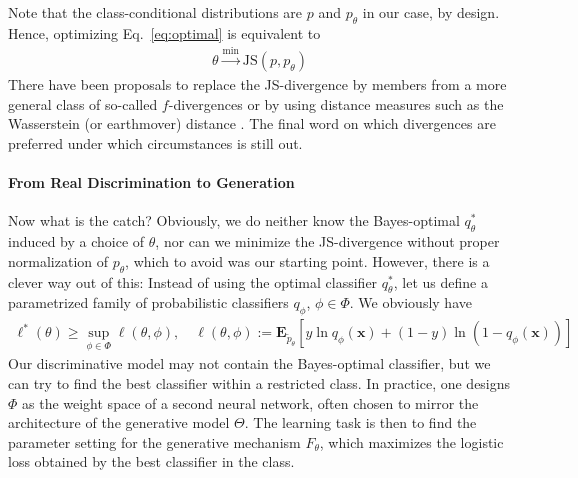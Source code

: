 \documentclass{article}
\newcommand{\E}{{\mathbf E}}
\newcommand{\x}{{\mathbf x}}
\begin{document}
Note that the class-conditional distributions are $p$ and $p_\theta$ in our case, by design.  Hence, optimizing Eq.~\eqref{eq:optimal} is equivalent to 
\begin{align}
\theta \stackrel \min \longrightarrow \text{JS}(p, p_\theta)
\end{align} 
There have been proposals to replace the JS-divergence by members from a more general class of so-called $f$-divergences \cite{nowozin2016f} or by using distance measures such as the Wasserstein (or earthmover) distance \cite{arjovsky2017wasserstein}. The final word on which divergences are preferred under which circumstances is still out. 

\paragraph{From Real Discrimination to Generation}

Now what is the catch? Obviously, we do neither know the Bayes-optimal $q^*_\theta$ induced by a choice of $\theta$, nor can we minimize the JS-divergence without proper normalization of $p_\theta$, which to avoid was our starting point. However, there is a clever way out of this: Instead of using the optimal classifier $q^*_\theta$, let us define a parametrized family of probabilistic classifiers $q_\phi$, $\phi \in \Phi$. We obviously have 
\begin{align}
\ell^*(\theta) \ge \sup_{\phi \in \Phi} \ell(\theta,\phi), \quad \ell(\theta,\phi) :=  \E_{\tilde p_\theta} \left[ y \ln q_\phi(\x) + (1-y) \ln(1-q_\phi(\x))\right] 
\end{align}
Our discriminative model may not contain the Bayes-optimal classifier, but we can try to find the best classifier within a restricted class. In practice, one designs $\Phi$ as the weight space of a second neural network, often chosen to mirror the architecture of the generative model $\Theta$. The learning task is then to find the parameter setting for the generative mechanism $F_\theta$, which maximizes the logistic loss obtained by the best classifier in the class. 
\end{document}

